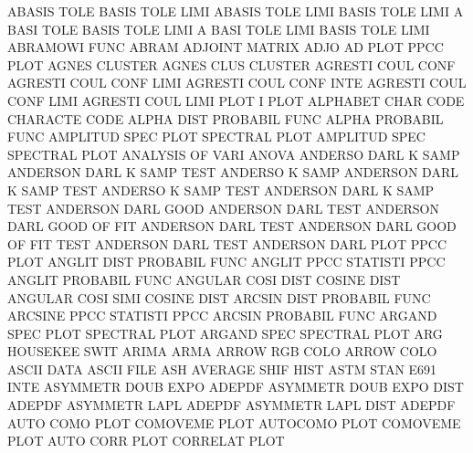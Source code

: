 ABASIS   TOLE                           BASIS    TOLE LIMI
ABASIS   TOLE LIMI                      BASIS    TOLE LIMI
A        BASI TOLE                      BASIS    TOLE LIMI
A        BASI TOLE LIMI                 BASIS    TOLE LIMI
ABRAMOWI FUNC                           ABRAM
ADJOINT                                 MATRIX   ADJO
AD       PLOT                           PPCC     PLOT
AGNES                                   CLUSTER
AGNES    CLUS                           CLUSTER
AGRESTI  COUL CONF                      AGRESTI  COUL CONF LIMI
AGRESTI  COUL CONF INTE                 AGRESTI  COUL CONF LIMI
AGRESTI  COUL LIMI PLOT                 I        PLOT
ALPHABET CHAR CODE                      CHARACTE CODE
ALPHA    DIST                           PROBABIL FUNC
ALPHA                                   PROBABIL FUNC
AMPLITUD SPEC PLOT                      SPECTRAL PLOT
AMPLITUD SPEC                           SPECTRAL PLOT
ANALYSIS OF   VARI                      ANOVA
ANDERSO  DARL K    SAMP                 ANDERSON DARL K    SAMP TEST
ANDERSO  K    SAMP                      ANDERSON DARL K    SAMP TEST
ANDERSO  K    SAMP TEST                 ANDERSON DARL K    SAMP TEST
ANDERSON DARL GOOD                      ANDERSON DARL TEST
ANDERSON DARL GOOD OF   FIT             ANDERSON DARL TEST
ANDERSON DARL GOOD OF   FIT  TEST       ANDERSON DARL TEST
ANDERSON DARL PLOT                      PPCC     PLOT
ANGLIT   DIST                           PROBABIL FUNC
ANGLIT   PPCC                           STATISTI PPCC
ANGLIT                                  PROBABIL FUNC
ANGULAR  COSI DIST                      COSINE   DIST
ANGULAR  COSI SIMI                      COSINE   DIST
ARCSIN   DIST                           PROBABIL FUNC
ARCSINE  PPCC                           STATISTI PPCC
ARCSIN                                  PROBABIL FUNC
ARGAND   SPEC PLOT                      SPECTRAL PLOT
ARGAND   SPEC                           SPECTRAL PLOT
ARG                                     HOUSEKEE SWIT
ARIMA                                   ARMA
ARROW    RGB  COLO                      ARROW    COLO
ASCII    DATA                           ASCII    FILE
ASH                                     AVERAGE  SHIF HIST
ASTM     STAN                           E691     INTE
ASYMMETR DOUB EXPO                      ADEPDF
ASYMMETR DOUB EXPO DIST                 ADEPDF
ASYMMETR LAPL                           ADEPDF
ASYMMETR LAPL DIST                      ADEPDF
AUTO     COMO PLOT                      COMOVEME PLOT
AUTOCOMO PLOT                           COMOVEME PLOT
AUTO     CORR PLOT                      CORRELAT PLOT
